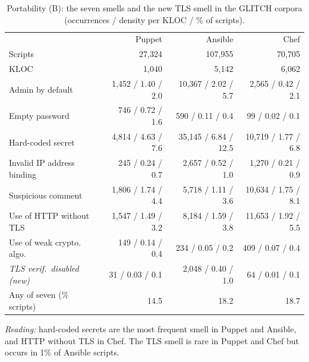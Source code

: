 \begin{table}[t]\centering\caption{Portability (B): the seven smells and the new TLS smell in the GLITCH corpora (occurrences / density per KLOC / \% of scripts).}\label{tab:rq2}
\scriptsize\setlength{\tabcolsep}{1.6pt}\begin{tabular}{lrrr}\toprule
 & Puppet & Ansible & Chef \\
Scripts & 27,324 & 107,955 & 70,705 \\
KLOC & 1,040 & 5,142 & 6,062 \\ \midrule
Admin by default & 1,452 / 1.40 / 2.0 & 10,367 / 2.02 / 5.7 & 2,565 / 0.42 / 2.1 \\
Empty password & 746 / 0.72 / 1.6 & 590 / 0.11 / 0.4 & 99 / 0.02 / 0.1 \\
Hard-coded secret & 4,814 / 4.63 / 7.6 & 35,145 / 6.84 / 12.5 & 10,719 / 1.77 / 6.8 \\
Invalid IP address binding & 245 / 0.24 / 0.7 & 2,657 / 0.52 / 1.0 & 1,270 / 0.21 / 0.9 \\
Suspicious comment & 1,806 / 1.74 / 4.4 & 5,718 / 1.11 / 3.6 & 10,634 / 1.75 / 8.1 \\
Use of HTTP without TLS & 1,547 / 1.49 / 3.2 & 8,184 / 1.59 / 3.8 & 11,653 / 1.92 / 5.5 \\
Use of weak crypto. algo. & 149 / 0.14 / 0.4 & 234 / 0.05 / 0.2 & 409 / 0.07 / 0.4 \\
\textit{TLS verif.\ disabled (new)} & 31 / 0.03 / 0.1 & 2,048 / 0.40 / 1.0 & 64 / 0.01 / 0.1 \\
\midrule Any of seven (\% scripts) & 14.5 & 18.2 & 18.7 \\
\bottomrule\end{tabular}
\par\vspace{3pt}\parbox{\linewidth}{\footnotesize\emph{Reading:} hard-coded secrets are the most frequent smell in Puppet and Ansible, and HTTP without TLS in Chef. The TLS smell is rare in Puppet and Chef but occurs in 1\% of Ansible scripts.}
\end{table}